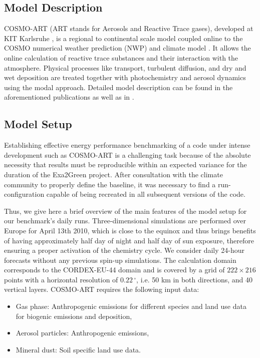 \subsection{Model Description}
\label{subsec:1.1}
COSMO-ART  (ART  stands  for   Aerosols  and  Reactive  Trace  gases),
developed  at  KIT  Karlsruhe  \citep{Vogel-2009}, is  a  regional  to
continental scale model coupled  online to the COSMO numerical weather
prediction (NWP) and climate model \citep{Baldauf-2011}. It allows the
online calculation of reactive  trace substances and their interaction
with  the atmosphere.   Physical processes  like  transport, turbulent
diffusion,  and  dry and  wet  deposition  are  treated together  with
photochemistry and aerosol dynamics using the modal approach. Detailed
model description  can be found in the  aforementioned publications as
well    as   in   \citep{Stanelle-2010,    Bangert-2012,   Knote-2011,
  Knote-2013}.

\subsection{Model Setup}
\label{subsec:1.2}
Establishing effective energy performance benchmarking of a code under
intense development such as COSMO-ART is a challenging task because of
the  absolute necessity that  results must  be reproducible  within an
expected  variance for the  duration of  the Exa2Green  project. After
consultation  with  the  climate  community  to  properly  define  the
baseline,  it was  necessary to  find a  run-configuration  capable of
being recreated in all subsequent versions of the code.

Thus, we give here a brief  overview of the main features of the model
setup for  our benchmark's daily  runs.  Three-dimensional simulations
are performed over  Europe for April 13th 2010, which  is close to the
equinox and thus  brings benefits of having approximately  half day of
night  and half  day  of  sun exposure,  therefore  ensuring a  proper
activation of the chemistry cycle. We consider daily 24-hour forecasts
without  any  previous spin-up  simulations.   The calculation  domain
corresponds to  the CORDEX-EU-44  domain and is  covered by a  grid of
$222\times   216$    points   with   a    horizontal   resolution   of
$0.22\,^{\circ}$,  i.e.  50  km in  both directions,  and  40 vertical
layers.  COSMO-ART requires the following input data:

\begin{itemize}
\item  Gas phase:  Anthropogenic emissions  for different  species and
  land use data for biogenic emissions and deposition,
\item Aerosol particles: Anthropogenic emissions,
\item Mineral dust: Soil specific land use data.
\end{itemize}

